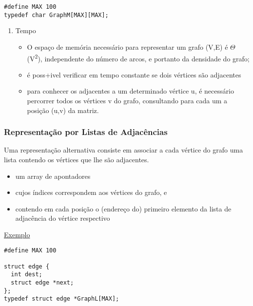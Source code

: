\documentclass[11pt]{article}
\begin{document}
\begin{verbatim}
#define MAX 100
typedef char GraphM[MAX][MAX];
\end{verbatim}

\begin{enumerate}
\item Tempo
\label{sec:org5b7956a}
\begin{itemize}
\item O espaço de memória necessário para representar um grafo (V,E) é \(\Theta\)(V\textsuperscript{2}),  independente do número de arcos, e portanto da densidade do grafo;
\item é poss+ivel verificar em tempo constante se dois vértices são adjacentes
\item para conhecer os  adjacentes a um determinado vértice u, é necessário percorrer todos os vértices v do grafo, consultando para cada um a posição (u,v) da matriz.
\end{itemize}
\end{enumerate}

\subsubsection{Representação por Listas de Adjacências}
\label{sec:orgd8c42f5}
Uma representação alternativa consiste em associar a cada vértice do grafo uma lista contendo os vértices que lhe são adjacentes.

\begin{itemize}
\item um array de apontadores
\item cujos índices correspondem aos vértices do grafo, e
\item contendo em cada posição o (endereço do) primeiro elemento da lista de adjacência do vértice respectivo
\end{itemize}

\href{./lista\_grafo.png}{Exemplo}

\begin{verbatim}
#define MAX 100

struct edge {
  int dest;
  struct edge *next;
};
typedef struct edge *GraphL[MAX];
\end{verbatim}
\end{document}
